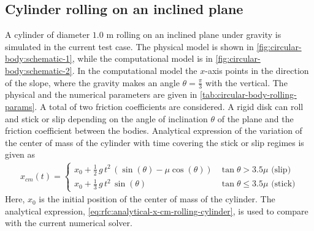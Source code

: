 \subsection{Cylinder rolling on an inclined plane}
\label{sec:cylinder-rolling-on-an-inclined-plane}
A cylinder of diameter $1.0$ m rolling on an inclined plane under gravity is
simulated in the current test case. The physical model is shown in
\cref{fig:circular-body:schematic-1}, while the computational model is in
\cref{fig:circular-body:schematic-2}. In the computational model the $x$-axis
points in the direction of the slope, where the gravity makes an angle
$\theta=\frac{\pi}{3}$ with the vertical. The physical and the numerical
parameters are given in \cref{tab:circular-body-rolling-params}. A total of two
friction coefficients are considered. A rigid disk can roll and stick or slip
depending on the angle of inclination $\theta$ of the plane and the friction
coefficient between the bodies. Analytical expression of the variation of the
center of mass of the cylinder with time covering the stick or slip regimes is
given as
\begin{align}
  \label{eq:rfc:analytical-x-cm-rolling-cylinder}
  x_{cm}(t) =
  \begin{cases}
  x_0 + \frac{1}{2} \, g \, t^2 \, (\sin(\theta) - \mu \cos(\theta)) & \tan{\theta} > 3.5\mu \text{ (slip)}\\
  x_0 + \frac{1}{3} \, g \, t^2 \, \sin(\theta) & \tan{\theta} \leq 3.5\mu \text{ (stick)}
\end{cases}
\end{align}
Here, $x_0$ is the initial position of the center of mass of the cylinder. The
analytical expression, \cref{eq:rfc:analytical-x-cm-rolling-cylinder}, is used
to compare with the current numerical solver.
